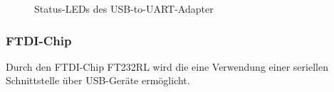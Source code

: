 \begin{figure}[htb]
    \centering
    \qquad
    \qquad
    \caption[Status-LEDs des USB-to-UART-Adapter]{Status-LEDs des \gls{USB-to-UART}-Adapter}
    \label{fig:usbtouart-leds}
\end{figure}

\subsubsection{FTDI-Chip}
Durch den FTDI-Chip FT232RL wird die eine Verwendung einer seriellen Schnittstelle über USB-Geräte ermöglicht.

